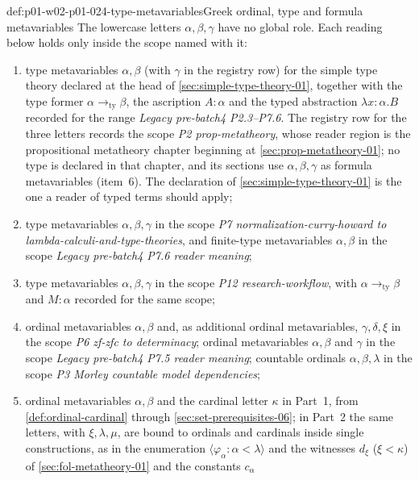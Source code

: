 \begin{hbconvention}{def:p01-w02-p01-024-type-metavariables}{Greek ordinal, type and formula metavariables}
The lowercase letters \(\alpha,\beta,\gamma\) have no global role.  Each
reading below holds only inside the scope named with it:
\begin{enumerate}
\item type metavariables \(\alpha,\beta\) (with \(\gamma\) in the registry
  row) for the simple type theory declared at the head of
  \cref{sec:simple-type-theory-01}, together with the type former
  \(\alpha\to_{\mathrm{ty}}\beta\), the ascription \(A:\alpha\) and the
  typed abstraction \(\lambda x{:}\alpha.B\) recorded for the range
  \emph{Legacy pre-batch4 P2.3--P7.6}.  The registry row for the three
  letters records the scope \emph{P2 prop-metatheory}, whose reader region
  is the propositional metatheory chapter beginning at
  \cref{sec:prop-metatheory-01}; no type is declared in that chapter, and
  its sections use \(\alpha,\beta,\gamma\) as formula metavariables (item~6).
  The declaration of \cref{sec:simple-type-theory-01} is the one a reader of
  typed terms should apply;
\item type metavariables \(\alpha,\beta,\gamma\) in the scope
  \emph{P7 normalization-curry-howard to lambda-calculi-and-type-theories},
  and finite-type metavariables \(\alpha,\beta\) in the scope
  \emph{Legacy pre-batch4 P7.6 reader meaning};
\item type metavariables \(\alpha,\beta,\gamma\) in the scope
  \emph{P12 research-workflow}, with \(\alpha\to_{\mathrm{ty}}\beta\) and
  \(M{:}\alpha\) recorded for the same scope;
\item ordinal metavariables \(\alpha,\beta\) and, as additional ordinal
  metavariables, \(\gamma,\delta,\xi\) in the scope
  \emph{P6 zf-zfc to determinacy}; ordinal metavariables \(\alpha,\beta\)
  and \(\gamma\) in the scope \emph{Legacy pre-batch4 P7.5 reader
  meaning}; countable ordinals \(\alpha,\beta,\lambda\) in the scope
  \emph{P3 Morley countable model dependencies};
\item ordinal metavariables \(\alpha,\beta\) and the cardinal letter
  \(\kappa\) in Part~1, from \cref{def:ordinal-cardinal} through
  \cref{sec:set-prerequisites-06}; in Part~2 the same letters, with
  \(\xi,\lambda,\mu\), are bound to ordinals and cardinals inside single
  constructions, as in the enumeration \(\langle\varphi_\alpha:\alpha<\lambda\rangle\)
  and the witnesses \(d_\xi\) (\(\xi<\kappa\)) of
  \cref{sec:fol-metatheory-01} and the constants \(c_\alpha\)

\end{enumerate}
\end{hbconvention}
